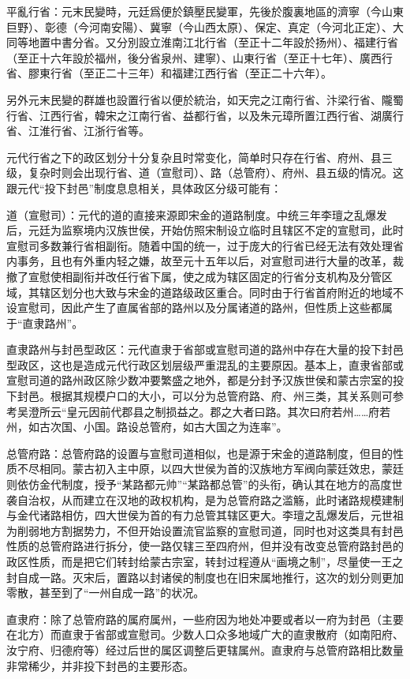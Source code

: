 平亂行省：元末民變時，元廷爲便於鎮壓民變軍，先後於腹裏地區的濟寧（今山東巨野）、彰德（今河南安陽）、冀寧（今山西太原）、保定、真定（今河北正定）、大同等地置中書分省。又分別設立淮南江北行省（至正十二年設於扬州）、福建行省（至正十六年設於福州，後分省泉州、建寧）、山東行省（至正十七年）、廣西行省、膠東行省（至正二十三年）和福建江西行省（至正二十六年）。

另外元末民變的群雄也設置行省以便於統治，如天完之江南行省、汴梁行省、隴蜀行省、江西行省，韓宋之江南行省、益都行省，以及朱元璋所置江西行省、湖廣行省、江淮行省、江浙行省等。

元代行省之下的政区划分十分复杂且时常变化，简单时只存在行省、府州、县三级，复杂时则会出现行省、道（宣慰司）、路（总管府）、府州、县五级的情况。这跟元代“投下封邑”制度息息相关，具体政区分级可能有：

道（宣慰司）：元代的道的直接来源即宋金的道路制度。中统三年李璮之乱爆发后，元廷为监察境内汉族世侯，开始仿照宋制设立临时且辖区不定的宣慰司，此时宣慰司多数兼行省相副衔。随着中国的统一，过于庞大的行省已经无法有效处理省内事务，且也有外重内轻之嫌，故至元十五年以后，对宣慰司进行大量的改革，裁撤了宣慰使相副衔并改任行省下属，使之成为辖区固定的行省分支机构及分管区域，其辖区划分也大致与宋金的道路级政区重合。同时由于行省首府附近的地域不设宣慰司，因此产生了直属省部的路州以及分属诸道的路州，但性质上这些都属于“直隶路州”。

直隶路州与封邑型政区：元代直隶于省部或宣慰司道的路州中存在大量的投下封邑型政区，这也是造成元代行政区划层级严重混乱的主要原因。基本上，直隶省部或宣慰司道的路州政区除少数冲要繁盛之地外，都是分封予汉族世侯和蒙古宗室的投下封邑。根据其规模户口的大小，可以分为总管府路、府、州三类，其关系则可参考吴澄所云“皇元因前代郡县之制损益之。郡之大者曰路。其次曰府若州……府若州，如古次国、小国。路设总管府，如古大国之为连率”。

总管府路：总管府路的设置与宣慰司道相似，也是源于宋金的道路制度，但目的性质不尽相同。蒙古初入主中原，以四大世侯为首的汉族地方军阀向蒙廷效忠，蒙廷则依仿金代制度，授予“某路都元帅”“某路都总管”的头衔，确认其在地方的高度世袭自治权，从而建立在汉地的政权机构，是为总管府路之滥觞，此时诸路规模建制与金代诸路相仿，四大世侯为首的有力总管其辖区更大。李璮之乱爆发后，元世祖为削弱地方割据势力，不但开始设置流官监察的宣慰司道，同时也对这类具有封邑性质的总管府路进行拆分，使一路仅辖三至四府州，但并没有改变总管府路封邑的政区性质，而是把它们转封给蒙古宗室，转封过程遵从“画境之制”，尽量使一王之封自成一路。灭宋后，置路以封诸侯的制度也在旧宋属地推行，这次的划分则更加零散，甚至到了“一州自成一路”的状况。

直隶府：除了总管府路的属府属州，一些府因为地处冲要或者以一府为封邑（主要在北方）而直隶于省部或宣慰司。少数人口众多地域广大的直隶散府（如南阳府、汝宁府、归德府等）经过后世的属区调整后更辖属州。直隶府与总管府路相比数量非常稀少，并非投下封邑的主要形态。

